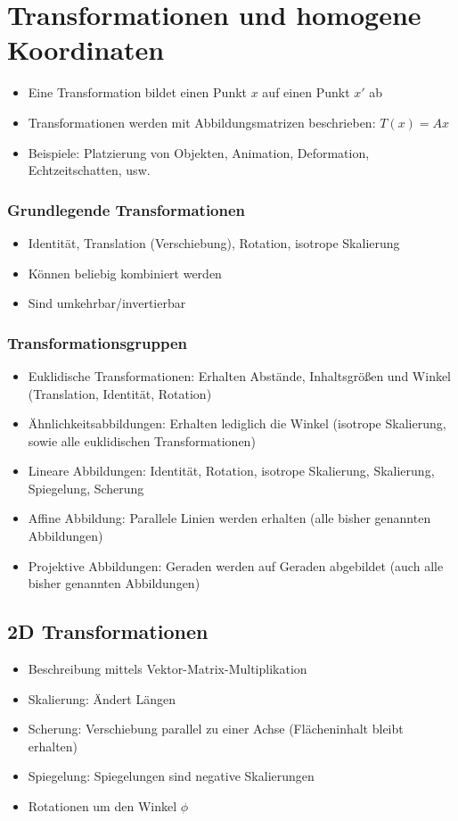 \section{Transformationen und homogene Koordinaten}
\begin{itemize}
	\item Eine Transformation bildet einen Punkt \(x\) auf einen Punkt \(x'\) ab
	\item Transformationen werden mit Abbildungsmatrizen beschrieben: \(T(x) = Ax\)
	\item Beispiele: Platzierung von Objekten, Animation, Deformation, Echtzeitschatten, usw.
\end{itemize}

\subsubsection{Grundlegende Transformationen}
\begin{itemize}
	\item Identität, Translation (Verschiebung), Rotation, isotrope Skalierung
	\item Können beliebig kombiniert werden
	\item Sind umkehrbar/invertierbar
\end{itemize}

\subsubsection{Transformationsgruppen}
\begin{itemize}
	\item Euklidische Transformationen: Erhalten Abstände, Inhaltsgrößen und Winkel (Translation, Identität, Rotation)
	\item Ähnlichkeitsabbildungen: Erhalten lediglich die Winkel (isotrope Skalierung, sowie alle euklidischen Transformationen)
	\item Lineare Abbildungen: Identität, Rotation, isotrope Skalierung, Skalierung, Spiegelung, Scherung
	\item Affine Abbildung: Parallele Linien werden erhalten (alle bisher genannten Abbildungen)
	\item Projektive Abbildungen: Geraden werden auf Geraden abgebildet (auch alle bisher genannten Abbildungen)
\end{itemize}


\subsection{2D Transformationen}
\begin{itemize}
	\item Beschreibung mittels Vektor-Matrix-Multiplikation
	\item Skalierung: Ändert Längen
	\item Scherung: Verschiebung parallel zu einer Achse (Flächeninhalt bleibt erhalten)
	\item Spiegelung: Spiegelungen sind negative Skalierungen
	\item Rotationen um den Winkel \(\phi\)
\end{itemize}

